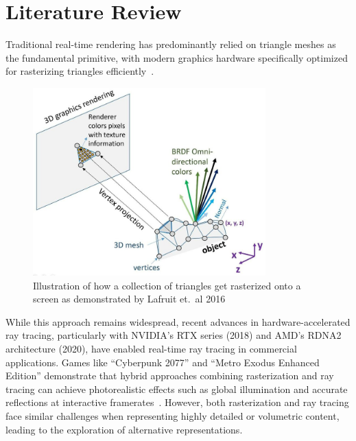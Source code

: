 \chapter{Literature Review}
Traditional real-time rendering has predominantly relied on triangle meshes as the fundamental primitive, with modern
graphics hardware specifically optimized for rasterizing triangles efficiently~\cite{akenine2019real}.

\begin{figure}[thp]
    \caption{Illustration of how a collection of triangles get rasterized onto a screen as demonstrated by Lafruit et.\ al 2016}
    \begin{center}
        \includegraphics[width=0.8\textwidth]{figures/mesh_rendering.jpg}
    \end{center}
\end{figure}

While this approach remains widespread, recent advances in hardware-accelerated ray tracing, particularly with NVIDIA's
RTX series (2018) and AMD's RDNA2 architecture (2020), have enabled real-time ray tracing in commercial applications.
Games like ``Cyberpunk 2077'' and ``Metro Exodus Enhanced Edition'' demonstrate that hybrid approaches combining
rasterization and ray tracing can achieve photorealistic effects such as global illumination and accurate reflections at
interactive framerates~\cite{keller2019we}. However, both rasterization and ray tracing face similar challenges when
representing highly detailed or volumetric content, leading to the exploration of alternative representations.

